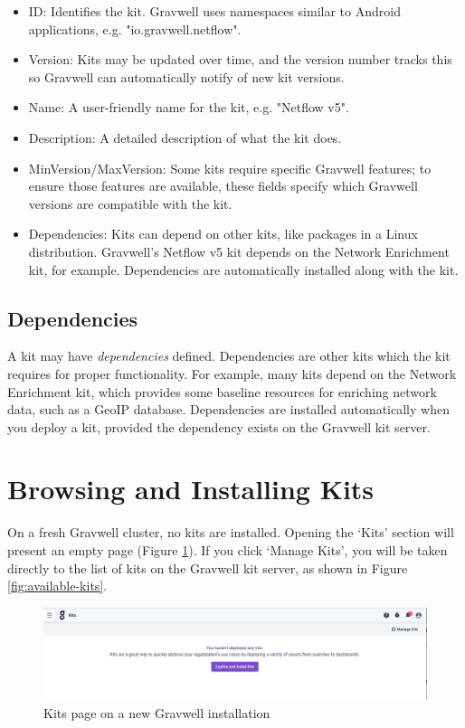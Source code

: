 \begin{itemize}
\tightlist
\item
ID: Identifies the kit. Gravwell uses namespaces similar to Android applications, e.g. "io.gravwell.netflow".
\item
Version: Kits may be updated over time, and the version number tracks this so Gravwell can automatically notify of new kit versions.
\item
Name: A user-friendly name for the kit, e.g. "Netflow v5".
\item
Description: A detailed description of what the kit does.
\item
MinVersion/MaxVersion: Some kits require specific Gravwell features; to ensure those features are available, these fields specify which Gravwell versions are compatible with the kit.
\item
Dependencies: Kits can depend on other kits, like packages in a Linux distribution. Gravwell's Netflow v5 kit depends on the Network Enrichment kit, for example. Dependencies are automatically installed along with the kit.
\end{itemize}

\subsection{Dependencies}

A kit may have \emph{dependencies} defined. Dependencies are other kits which the kit requires for proper functionality. For example, many kits depend on the Network Enrichment kit, which provides some baseline resources for enriching network data, such as a GeoIP database. Dependencies are installed automatically when you deploy a kit, provided the dependency exists on the Gravwell kit server.

\section{Browsing and Installing Kits}

On a fresh Gravwell cluster, no kits are installed. Opening the `Kits' section will present an empty page (Figure \ref{fig:blank-kits}). If you click `Manage Kits', you will be taken directly to the list of kits on the Gravwell kit server, as shown in Figure \ref{fig:available-kits}.

\begin{figure}
	\includegraphics[width=0.85\linewidth]{images/blank-kits.png}
	\caption{Kits page on a new Gravwell installation}
	\label{fig:blank-kits}
\end{figure}


